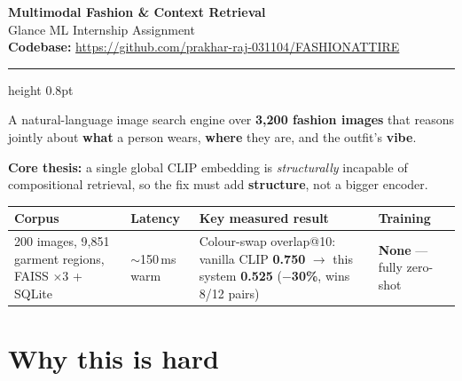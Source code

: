 \documentclass[10pt,a4paper]{article}
\newcommand{\repourl}{https://github.com/prakhar-raj-031104/FASHIONATTIRE}
\begin{document}
\pagestyle{plain}

\begin{center}
  {\LARGE\bfseries\color{HeadNavy} Multimodal Fashion \& Context Retrieval}\\[3pt]
  {\normalsize Glance ML Internship Assignment}\\[4pt]
  {\normalsize \textbf{Codebase:} \href{\repourl}{\repourl}}
\end{center}
\vspace{2pt}
\hrule height 0.8pt
\vspace{6pt}

A natural-language image search engine over \textbf{3{,}200 fashion images} that reasons jointly
about \textbf{what} a person wears, \textbf{where} they are, and the outfit's \textbf{vibe}.

\textbf{Core thesis:} a single global CLIP embedding is \emph{structurally} incapable of
compositional retrieval, so the fix must add \textbf{structure}, not a bigger encoder.

\begin{center}\small
\begin{tabularx}{\textwidth}{@{}>{\raggedright\arraybackslash}p{}
                                >{\raggedright\arraybackslash}p{}
                                >{\raggedright\arraybackslash}X
                                >{\raggedright\arraybackslash}p{}@{}}
\toprule
\textbf{Corpus} & \textbf{Latency} & \textbf{Key measured result} & \textbf{Training} \\
\midrule
3{,}200 images, 9{,}851 garment regions, FAISS $\times$3 + SQLite
& $\sim$150\,ms warm
& Colour-swap overlap@10: vanilla CLIP \textbf{0.750} $\rightarrow$ this system \textbf{0.525}
  (\textbf{$-$30\%}, wins 8/12 pairs)
& \textbf{None} --- fully zero-shot \\
\bottomrule
\end{tabularx}
\end{center}

\section{Why this is hard}
\end{document}
